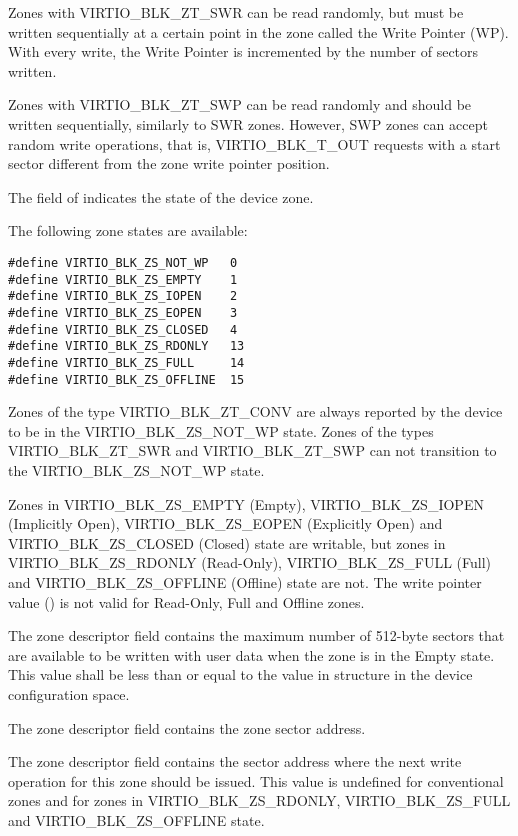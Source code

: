 Zones with VIRTIO_BLK_ZT_SWR can be read randomly, but must be written
sequentially at a certain point in the zone called the Write Pointer (WP). With
every write, the Write Pointer is incremented by the number of sectors written.

Zones with VIRTIO_BLK_ZT_SWP can be read randomly and should be written
sequentially, similarly to SWR zones. However, SWP zones can accept random write
operations, that is, VIRTIO_BLK_T_OUT requests with a start sector different
from the zone write pointer position.

The field  of  indicates the
state of the device zone.

The following zone states are available:

\begin{lstlisting}
#define VIRTIO_BLK_ZS_NOT_WP   0
#define VIRTIO_BLK_ZS_EMPTY    1
#define VIRTIO_BLK_ZS_IOPEN    2
#define VIRTIO_BLK_ZS_EOPEN    3
#define VIRTIO_BLK_ZS_CLOSED   4
#define VIRTIO_BLK_ZS_RDONLY   13
#define VIRTIO_BLK_ZS_FULL     14
#define VIRTIO_BLK_ZS_OFFLINE  15
\end{lstlisting}

Zones of the type VIRTIO_BLK_ZT_CONV are always reported by the device to be in
the VIRTIO_BLK_ZS_NOT_WP state. Zones of the types VIRTIO_BLK_ZT_SWR and
VIRTIO_BLK_ZT_SWP can not transition to the VIRTIO_BLK_ZS_NOT_WP state.

Zones in VIRTIO_BLK_ZS_EMPTY (Empty), VIRTIO_BLK_ZS_IOPEN (Implicitly Open),
VIRTIO_BLK_ZS_EOPEN (Explicitly Open) and VIRTIO_BLK_ZS_CLOSED (Closed) state
are writable, but zones in VIRTIO_BLK_ZS_RDONLY (Read-Only), VIRTIO_BLK_ZS_FULL
(Full) and VIRTIO_BLK_ZS_OFFLINE (Offline) state are not. The write pointer
value () is not valid for Read-Only, Full and Offline zones.

The zone descriptor field  contains the maximum number of 512-byte
sectors that are available to be written with user data when the zone is in the
Empty state. This value shall be less than or equal to the 
value in  structure in the device
configuration space.

The zone descriptor field  contains the zone sector address.

The zone descriptor field  contains the sector address where the
next write operation for this zone should be issued. This value is undefined
for conventional zones and for zones in VIRTIO_BLK_ZS_RDONLY,
VIRTIO_BLK_ZS_FULL and VIRTIO_BLK_ZS_OFFLINE state.

